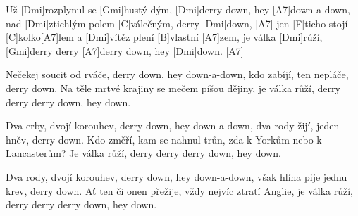 
\sloka
Už [Dmi]rozplynul se [Gmi]hustý dým, [Dmi]derry down, hey [A7]down-a-down,
nad [Dmi]ztichlým polem [C]válečným, derry [Dmi]down, [A7]
jen [F]ticho stojí [C]kolko[A7]lem a [Dmi]vítěz plení [B]vlastní [A7]zem,
je válka [Dmi]růží, [Gmi]derry derry [A7]derry down, hey [Dmi]down. [A7]

\sloka
Nečekej soucit od rváče, derry down, hey down-a-down,
kdo zabíjí, ten nepláče, derry down.
Na těle mrtvé krajiny se mečem píšou dějiny,
je válka růží, derry derry derry down, hey down.

\sloka
Dva erby, dvojí korouhev, derry down, hey down-a-down,
dva rody žijí, jeden hněv, derry down.
Kdo změří, kam se nahnul trůn, zda k Yorkům nebo k Lancasterům?
Je válka růží, derry derry derry down, hey down.

\sloka
Dva rody, dvojí korouhev, derry down, hey down-a-down,
však hlína pije jednu krev, derry down.
Ať ten či onen přežije, vždy nejvíc ztratí Anglie,
je válka růží, derry derry derry down, hey down.
